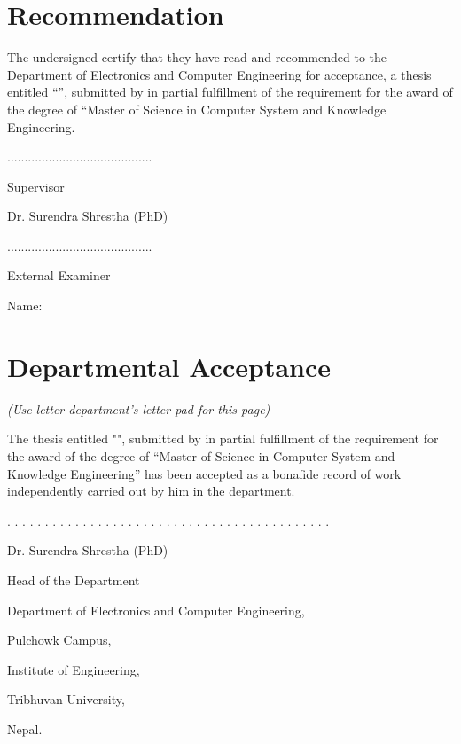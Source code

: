 \doublespacing


\chapter*{Recommendation}

The undersigned certify that they have read and recommended to the Department of Electronics and Computer Engineering for acceptance, a thesis entitled “\textit{\thetitle}”, submitted by {\theauthor} in partial fulfillment of the requirement for the award of the degree of “Master of Science in Computer System and Knowledge Engineering.

\vspace{3cm}
..........................................

Supervisor

Dr. Surendra Shrestha (PhD)

\vspace{3cm}


..........................................

External Examiner

Name:









\chapter*{Departmental Acceptance}

\textit{(Use letter department’s letter pad for this page)}
\vspace{3cm}

The thesis entitled "\thetitle", submitted by {\theauthor} in partial fulfillment of the requirement for the award of the degree of “Master of Science in Computer System and Knowledge Engineering” has been accepted as a bonafide record of work independently carried out by him in the department.





\vspace{3cm}
. . . . . . . . . . . . . . . . . . . . . . . . . . . . . . . . . . . . . . . . . . . 

Dr. Surendra Shrestha (PhD)

Head of the Department

Department of Electronics and Computer Engineering,

Pulchowk Campus,

Institute of Engineering,

Tribhuvan University,

Nepal.

